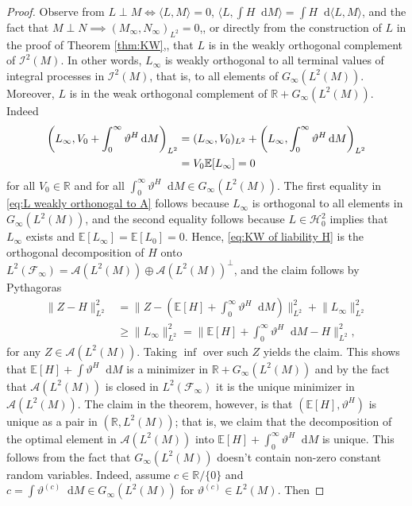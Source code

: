 \documentclass[11pt,a4paper,twoside,openany]{report}
\numberwithin{equation}{section}
\newcommand{\diff}{\mathop{}\!\mathrm{d}}
\theoremstyle{plain} %
\theoremstyle{definition} %
\theoremstyle{remark} %
\begin{document}
\begin{proof}
 
          Observe from \(L\perp M\iff\langle L,M\rangle=0\), \(\langle L,\int H\diff M\rangle = \int H\diff\langle L,M\rangle\), and the fact that \(M\perp N\implies (M_{\infty},N_{\infty})_{L^2}=0\),, or directly from the construction of \(L\) in the proof of Theorem \ref{thm:KW},, that \(L\) is in the weakly orthogonal complement of  \(\mathcal{I}^2(M)\). In other words, \(L_{\infty}\) is weakly orthogonal to all terminal values of integral processes in \(\mathcal{I}^2(M)\), that is, to all elements of \(G_{\infty}(L^2(M))\). Moreover, \(L\) is in the weak orthogonal complement of \(\mathbb{R}+G_{\infty}(L^2(M))\). Indeed
\begin{align}\label{eq:L weakly orthonogal to A}
    \bigg(L_{\infty},V_0+\int_0^{\infty} \vartheta^H\diff M\bigg)_{L^2}\notag&= (L_{\infty},V_0)_{L^2}+ \bigg(L_{\infty},\int_0^{\infty} \vartheta^H\diff M\bigg)_{L^2}\\&=V_0\mathbb{E}[L_{\infty}]=0
\end{align}
for all \(V_0\in\mathbb{R}\) and for all \(\int_0^{\infty}\vartheta^H\diff M\in G_{\infty}(L^2(M))\). The first equality in \eqref{eq:L weakly orthonogal to A} follows because \(L_{\infty}\) is orthogonal to all elements in \(G_{\infty}(L^2(M))\), and the second equality follows because \(L\in\mathcal{H}_0^2\) implies that \(L_{\infty}\) exists and \(\mathbb{E}[L_{\infty}]=\mathbb{E}[L_0]=0\). Hence, \eqref{eq:KW of liability H} is the orthogonal decomposition of \(H\) onto \(L^2(\mathcal{F}_{\infty})=\mathcal{A}(L^2(M))\oplus \mathcal{A}(L^2(M))^{\perp}\), and the claim follows by Pythagoras 
\begin{align*}
   \lVert Z-H\rVert_{L^2}^2&=
   \bigg\lVert Z -\left(\mathbb{E}[H]+\int_0^{\infty}\vartheta^H\diff M\right)\bigg\rVert_{L^2}^2+\lVert L_{\infty}\rVert_{L^2}^2
   \\&\geq \lVert L_{\infty}\rVert_{L^2}^2=\bigg\lVert \mathbb{E}[H]+\int_0^{\infty}\vartheta^H\diff M-H\bigg\rVert_{L^2}^2,
\end{align*}
for any \(Z\in\mathcal{A}(L^2(M))\). Taking \(\inf\) over such \(Z\) yields the claim. This shows that \(\mathbb{E}[H]+\int \vartheta^H\diff M\) is a minimizer in \(\mathbb{R}+G_{\infty}(L^2(M))\) and by the fact that \(\mathcal{A}(L^2(M))\) is closed in \(L^2(\mathcal{F}_{\infty})\) it is the unique minimizer in \(\mathcal{A}(L^2(M))\). The claim in the theorem, however, is that \((\mathbb{E}[H],\vartheta^H)\) is unique as a pair in \((\mathbb{R},L^2(M))\); that is, we claim that the decomposition of the optimal element in \(\mathcal{A}(L^2(M))\) into \(\mathbb{E}[H]+\int_0^\infty \vartheta^H\diff M\) is unique. This follows from the fact that \(G_{\infty}(L^2(M))\) doesn't contain non-zero constant random variables. Indeed, assume \(c\in\mathbb{R}/\{0\}\) and \(c=\int \vartheta^{(c)}\diff M\in G_{\infty}(L^2(M)) \) for \(\vartheta^{(c)}\in L^2(M)\). Then 

\end{proof}
\end{document}
